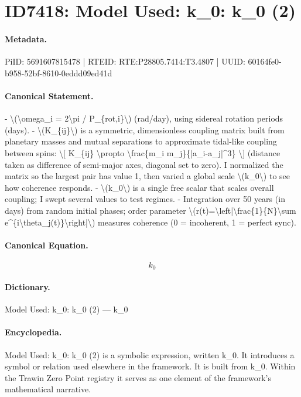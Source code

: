 \section*{ID7418: Model Used: k\_0: k\_0 (2)}
\paragraph{Metadata.}
PiID: 5691607815478 | RTEID: RTE:P28805.7414:T3.4807 | UUID: 60164fe0-b958-52bf-8610-0eddd09ed41d

\paragraph{Canonical Statement.}
- \textbackslash{}(\textbackslash{}omega\_i = 2\textbackslash{}pi / P\_\{rot,i\}\textbackslash{}) (rad/day), using sidereal rotation periods (days). - \textbackslash{}(K\_\{ij\}\textbackslash{}) is a symmetric, dimensionless coupling matrix built from planetary masses and mutual separations to approximate tidal-like coupling between spins: \textbackslash{}[ K\_\{ij\} \textbackslash{}propto \textbackslash{}frac\{m\_i m\_j\}\{|a\_i-a\_j|\textasciicircum{}3\} \textbackslash{}] (distance taken as difference of semi-major axes, diagonal set to zero). I normalized the matrix so the largest pair has value 1, then varied a global scale \textbackslash{}(k\_0\textbackslash{}) to see how coherence responds. - \textbackslash{}(k\_0\textbackslash{}) is a single free scalar that scales overall coupling; I swept several values to test regimes. - Integration over 50 years (in days) from random initial phases; order parameter \textbackslash{}(r(t)=\textbackslash{}left|\textbackslash{}frac\{1\}\{N\}\textbackslash{}sum e\textasciicircum{}\{i\textbackslash{}theta\_j(t)\}\textbackslash{}right|\textbackslash{}) measures coherence (0 = incoherent, 1 = perfect sync).

\paragraph{Canonical Equation.}
\[
k_0
\]

\paragraph{Dictionary.}
Model Used: k\_0: k\_0 (2) — k\_0

\paragraph{Encyclopedia.}
Model Used: k\_0: k\_0 (2) is a symbolic expression, written k\_0. It introduces a symbol or relation used elsewhere in the framework. It is built from k\_0. Within the Trawin Zero Point registry it serves as one element of the framework's mathematical narrative.
